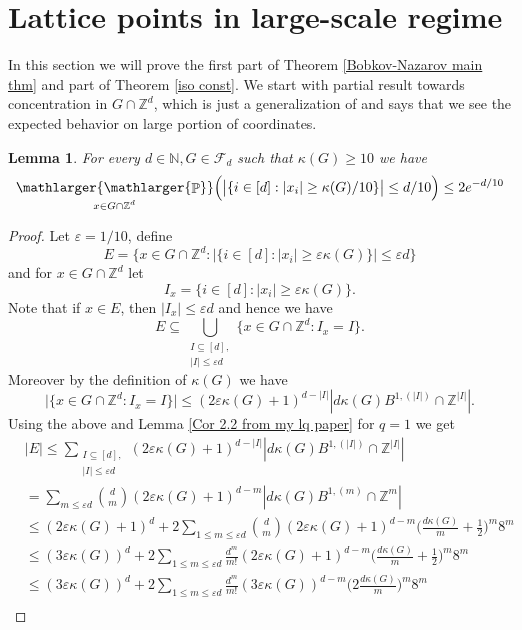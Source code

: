 \documentclass[a4paper,oneside, reqno]{amsart}
\numberwithin{equation}{section}
\newtheorem{Lem}[Thm]{Lemma}
\theoremstyle{definition}%
\theoremstyle{definition}
\theoremstyle{definition}%
\theoremstyle{definition}
\newcommand{\Pro}{\mathop{\mathbb{P}}}
\newcommand{\Z}{\mathbb{Z}}
\newcommand{\N}{\mathbb{N}}
\newcommand{\spr}[1]{\underset{_{\substack{#1}}}{\mathlarger{\mathlarger{\Pro}}}}
\begin{document}
\section{Lattice points in large-scale regime}
In this section we will prove the first part of Theorem \ref{Bobkov-Nazarov main thm} and part of Theorem \ref{iso const}.
We start with partial result towards concentration in $G \cap \Z^d$, which is just a generalization of \cite[Lemma 2.4]{balls} and says that we see the expected behavior on large portion of coordinates.
\begin{Lem} \label{pos_prop_conc}
For every $d \in \N, G \in \mathcal{F}_d$ such that $\kappa(G) \ge 10$ we have
\[
\spr{x \in G \cap \Z^d} \Big(\big| \{ i \in [d]: |x_i| \ge  \kappa(G)/10 \}\big| \le  d/10\Big) \le 2 e^{-d/10} 
\]
\end{Lem}
\begin{proof}
Let $\varepsilon=1/10$, define
\[
E=\Big\{ x \in G \cap \Z^d: | \{ i \in [d]: |x_i| \ge \varepsilon \kappa(G) \}| \le \varepsilon d \Big\}
\]
and for $x \in G \cap \Z^d$ let
\[
I_x= \big\{ i \in [d]: |x_i| \ge \varepsilon \kappa(G) \big\}.
\]
Note that if $x \in E$, then $|I_x| \le \varepsilon d$ and hence we have 
\[
E \subseteq \bigcup_{\substack{I \subseteq [d], \\ |I| \le \varepsilon d}} \Big\{ x\in G \cap \Z^d: I_x=I \Big\}.
\]
Moreover by the definition of $\kappa(G)$ we have
\[
\Big|  \Big\{ x\in G \cap \Z^d: I_x=I \Big\} \Big| \le (2 \varepsilon \kappa(G)+1)^{d-|I|} |d \kappa(G) B^{1,(|I|)} \cap \Z^{|I|}|.
\]
Using the above and Lemma \ref{Cor 2.2 from my lq paper} for $q=1$ we get
\begin{equation}
    \begin{split}
    &|E| \le \sum_{\substack{I \subseteq [d], \\ |I| \le \varepsilon d}}  (2 \varepsilon \kappa(G)+1)^{d-|I|} |d \kappa(G) B^{1,(|I|)} \cap \Z^{|I|}|\\
    &= \sum_{m \le \varepsilon d} \binom{d}{m}(2 \varepsilon \kappa(G)+1)^{d-m} |d \kappa(G) B^{1,(m)} \cap \Z^{m}| \\
    &\le (2\varepsilon \kappa(G)+1)^d+ 2 \sum_{1 \le m \le \varepsilon d} \binom{d}{m}(2 \varepsilon \kappa(G)+1)^{d-m} \Big(\frac{d\kappa(G)}{m}+\frac{1}{2}\Big)^m 8^m \\
    &\le (3\varepsilon \kappa(G))^d+2 \sum_{1 \le m \le \varepsilon d}\frac{d^m}{m!}(2 \varepsilon \kappa(G)+1)^{d-m} \Big(\frac{d\kappa(G)}{m}+\frac{1}{2}\Big)^m 8^m \\
    &\le (3\varepsilon \kappa(G))^d+2 \sum_{1 \le m \le \varepsilon d}\frac{d^m}{m!}(3 \varepsilon \kappa(G))^{d-m} \Big(2\frac{d\kappa(G)}{m}\Big)^m 8^m \\

\end{split}
\end{equation}
\end{proof}
\end{document}
